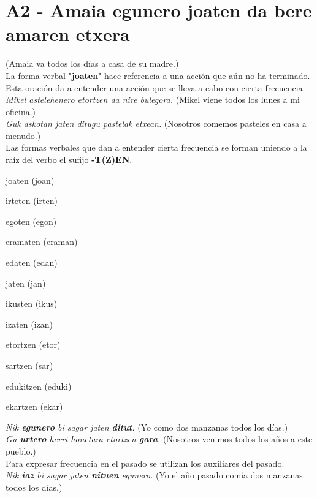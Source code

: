 \documentclass[11pt, a4paper]{article}
\begin{document}
\section{A2 - Amaia egunero joaten da bere amaren etxera}
\indent \indent (Amaia va todos los días a casa de su madre.)\\
\noindent La forma verbal "\textbf{joaten}" hace referencia a una acción que aún no ha terminado. Esta oración da a entender una acción que se lleva a cabo con cierta frecuencia.\\
\indent \textit{Mikel astelehenero etortzen da nire bulegora.}
(Mikel viene todos los lunes a mi oficina.)\\
\indent \textit{Guk askotan jaten ditugu pastelak etxean.} (Nosotros comemos pasteles en casa a menudo.)\\

\noindent Las formas verbales que dan a entender cierta frecuencia se forman uniendo a la raíz del verbo el sufijo \textbf{-T(Z)EN}.\\
\begin{itemize}
\begin{multicols}{2}
\item joaten (joan)
\item irteten (irten)
\item egoten (egon)
\item eramaten (eraman)
\item edaten (edan)
\item jaten (jan)
\item ikusten (ikus)
\item izaten (izan)
\item etortzen (etor)
\item sartzen (sar)
\item edukitzen (eduki)
\item ekartzen (ekar)
\end{multicols}
\end{itemize}



\indent \textit{Nik \textbf{egunero} bi sagar jaten \textbf{ditut}.}
(Yo como dos manzanas todos los días.)\\
\indent \textit{Gu \textbf{urtero} herri honetara etortzen \textbf{gara}.}
(Nosotros venimos todos los años a este pueblo.)\\
\noindent Para expresar frecuencia en el pasado se utilizan los auxiliares del pasado.\\
\indent \textit{Nik \textbf{iaz} bi sagar jaten \textbf{nituen} egunero.}
(Yo el año pasado comía dos manzanas todos los días.)
\end{document}
